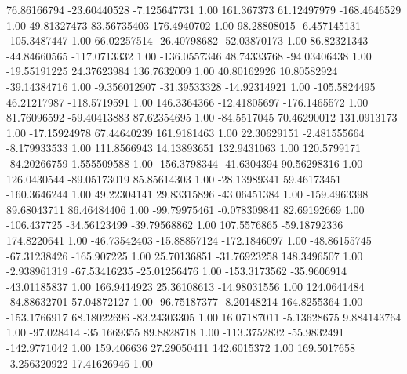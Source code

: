 76.86166794	-23.60440528	-7.125647731 1.00
161.367373	61.12497979	-168.4646529 1.00
49.81327473	83.56735403	176.4940702 1.00
98.28808015	-6.457145131	-105.3487447 1.00
66.02257514	-26.40798682	-52.03870173 1.00
86.82321343	-44.84660565	-117.0713332 1.00
-136.0557346	48.74333768	-94.03406438 1.00
-19.55191225	24.37623984	136.7632009 1.00
40.80162926	10.80582924	-39.14384716 1.00
-9.356012907	-31.39533328	-14.92314921 1.00
-105.5824495	46.21217987	-118.5719591 1.00
146.3364366	-12.41805697	-176.1465572 1.00
81.76096592	-59.40413883	87.62354695 1.00
-84.5517045	70.46290012	131.0913173 1.00
-17.15924978	67.44640239	161.9181463 1.00
22.30629151	-2.481555664	-8.179933533 1.00
111.8566943	14.13893651	132.9431063 1.00
120.5799171	-84.20266759	1.555509588 1.00
-156.3798344	-41.6304394	90.56298316 1.00
126.0430544	-89.05173019	85.85614303 1.00
-28.13989341	59.46173451	-160.3646244 1.00
49.22304141	29.83315896	-43.06451384 1.00
-159.4963398	89.68043711	86.46484406 1.00
-99.79975461	-0.078309841	82.69192669 1.00
-106.437725	-34.56123499	-39.79568862 1.00
107.5576865	-59.18792336	174.8220641 1.00
-46.73542403	-15.88857124	-172.1846097 1.00
-48.86155745	-67.31238426	-165.907225 1.00
25.70136851	-31.76923258	148.3496507 1.00
-2.938961319	-67.53416235	-25.01256476 1.00
-153.3173562	-35.9606914	-43.01185837 1.00
166.9414923	25.36108613	-14.98031556 1.00
124.0641484	-84.88632701	57.04872127 1.00
-96.75187377	-8.20148214	164.8255364 1.00
-153.1766917	68.18022696	-83.24303305 1.00
16.07187011	-5.13628675	9.884143764 1.00
-97.028414	-35.1669355	89.8828718 1.00
-113.3752832	-55.9832491	-142.9771042 1.00
159.406636	27.29050411	142.6015372 1.00
169.5017658	-3.256320922	17.41626946 1.00
